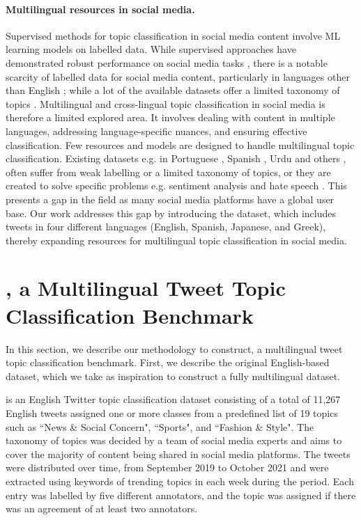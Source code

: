\paragraph{Multilingual resources in social media.}
Supervised methods for topic classification in social media content involve \ac{ML} learning models on labelled data. While supervised approaches have demonstrated robust performance on social media tasks \cite{huang2013sentiment,camacho2022tweetnlp}, there is a notable scarcity of labelled data for social media content, particularly in languages other than English \cite{selvaperumal2014short}; while a lot of the available datasets offer a limited taxonomy of topics \cite{vadivukarassi2019comparison}. 
Multilingual and cross-lingual topic classification in social media is therefore a limited explored area. It involves dealing with content in multiple languages, addressing language-specific nuances, and ensuring effective classification. Few resources and models are designed to handle multilingual topic classification. Existing datasets e.g. in Portuguese \cite{daouadi2021optimizing}, Spanish \cite{imran2016twitter}, Urdu \cite{kausar2021hashcat} and others \cite{chowdhury2020cross}, often suffer from weak labelling or a limited taxonomy of topics, or they are created to solve specific problems e.g. sentiment analysis \cite{muhammad2023semeval} and hate speech \cite{ousidhoum-etal-2019-multilingual}. %
This presents a gap in the field as many social media platforms have a global user base. Our work addresses this gap by introducing the {\XTOPIC} dataset, which includes tweets in four different languages (English, Spanish, Japanese, and Greek), thereby expanding resources for multilingual topic classification in social media. 


\section{\XTOPIC, a Multilingual Tweet Topic Classification Benchmark}

In this section, we describe our methodology to construct, a multilingual tweet topic classification benchmark. First, we describe the original English-based \TweetTopic dataset, which we take as inspiration to construct a fully multilingual dataset.

{\TweetTopic} \cite{antypas2022twitter} is an English Twitter topic classification dataset consisting of a total of 11,267 English tweets assigned one or more classes from a predefined list of 19 topics such as ``News \& Social Concern", ``Sports", and ``Fashion \& Style". The taxonomy of topics was decided by a team of social media experts and aims to cover the majority of content being shared in social media platforms. The tweets were distributed over time, from September 2019 to October 2021 and were extracted using keywords of trending topics in each week during the period. Each entry was labelled by five different annotators, and the topic was assigned if there was an agreement of at least two annotators. 


